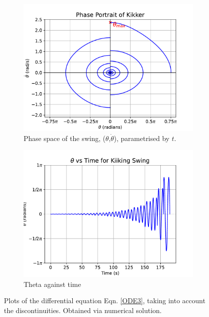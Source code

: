 \documentclass[12pt]{article}
\begin{document}
\begin{figure}[ht]
    \centering
    \begin{subfigure}[b]{0.49\textwidth}
        \centering
        \includegraphics[width=\textwidth]{Figures/phase_plot.pdf}
        \caption{Phase space of the swing, ($\theta$,$\dot{\theta}$), parametrised by $t$.}
        \label{fig:phase_space}
    \end{subfigure}
    \hfill
    \begin{subfigure}[b]{0.49\textwidth}
        \centering
        \includegraphics[width=\textwidth]{Figures/thetatimeplot.pdf}
        \caption{Theta against time}
        \label{fig:theta_time}
    \end{subfigure}
    \caption{Plots of the differential equation Eqn. \ref{ODE3}, taking into account the discontinuities. Obtained via numerical solution.}
\end{figure}
\end{document}
